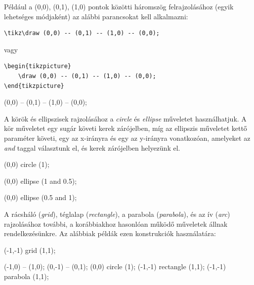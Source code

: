 Például a (0,0), (0,1), (1,0)  pontok közötti háromszög felrajzolásához (egyik lehetséges módjaként) az alábbi parancsokat kell alkalmazni:

\begin{lstlisting}[style=latex]
\tikz\draw (0,0) -- (0,1) -- (1,0) -- (0,0);
\end{lstlisting}

vagy

\begin{lstlisting}[style=latex]
\begin{tikzpicture}
    \draw (0,0) -- (0,1) -- (1,0) -- (0,0);
\end{tikzpicture}
\end{lstlisting}

\begin{tikzcode}
\draw (0,0) -- (0,1) -- (1,0) -- (0,0);
\end{tikzcode}


A körök és ellipszisek rajzolásához a \textit{circle} és \textit{ellipse} műveletet használhatjuk. A kör műveletet egy sugár követi kerek zárójelben, míg az ellipszis műveletet kettő paraméter követi, egy az x-irányra és egy az y-irányra vonatkozóan, amelyeket az \textit{and} taggal választunk el, és kerek zárójelben helyezünk el. 

\begin{tikzcode}
\draw (0,0) circle (1);
\end{tikzcode}

\begin{tikzcode}
\draw (0,0) ellipse (1 and 0.5);
\end{tikzcode}

\begin{tikzcode}
\draw (0,0) ellipse (0.5 and 1);
\end{tikzcode}

A rácsháló (\textit{grid}), téglalap (\textit{rectangle}), a parabola (\textit{parabola}), és az ív (\textit{arc}) rajzolásához további, a korábbiakhoz hasonlóan működő műveletek állnak rendelkezésünkre. Az alábbiak példák ezen konstrukciók használatára:

\begin{tikzcode}
\draw (-1,-1) grid (1,1);
\end{tikzcode}

\begin{tikzcode}
\draw (-1,0) -- (1,0);
\draw (0,-1) -- (0,1);
\draw (0,0) circle (1);
\draw (-1,-1) rectangle (1,1);
\draw (-1,-1) parabola (1,1);
\end{tikzcode}

